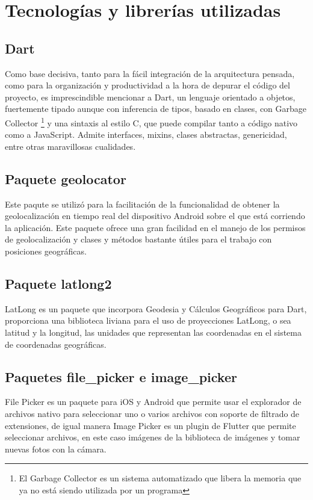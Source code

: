 \section{Tecnologías y librerías utilizadas}
\subsection{Dart}
Como base decisiva, tanto para la fácil integración de la arquitectura pensada, como para la organización y productividad a la hora de depurar el código del proyecto,
es imprescindible mencionar a Dart, un lenguaje orientado a objetos, fuertemente tipado aunque con inferencia de tipos, basado en clases, con Garbage Collector
\footnote{El Garbage Collector es un sistema automatizado que libera la memoria que ya no está siendo utilizada por un programa}
y una sintaxis al estilo C, que puede compilar tanto a código nativo como a JavaScript. Admite interfaces, mixins, clases abstractas, genericidad, entre otras maravillosas cualidades. \cite{dartOficial}
\subsection{Paquete geolocator}
Este paqute se utilizó para la facilitación de la funcionalidad de obtener la geolocalización en tiempo real del dispositivo Android sobre el que está corriendo la aplicación.
Este paquete ofrece una gran facilidad en el manejo de los permisos de geolocalización y clases y métodos bastante útiles para el trabajo con posiciones geográficas.
\subsection{Paquete latlong2}
LatLong es un paquete que incorpora Geodesia y Cálculos Geográficos para Dart,
proporciona una biblioteca liviana para el uso de proyecciones LatLong, o sea latitud y
la longitud, las unidades que representan las coordenadas en el sistema de coordenadas
geográficas. \cite{latlong2}
\subsection{Paquetes file\_picker e image\_picker}
File Picker es un paquete para iOS y Android que permite usar el explorador de archivos nativo para seleccionar uno o varios archivos con soporte de filtrado de extensiones,
de igual manera Image Picker es un plugin de Flutter que permite seleccionar archivos,
en este caso imágenes de la biblioteca de imágenes y tomar nuevas fotos con la cámara.

